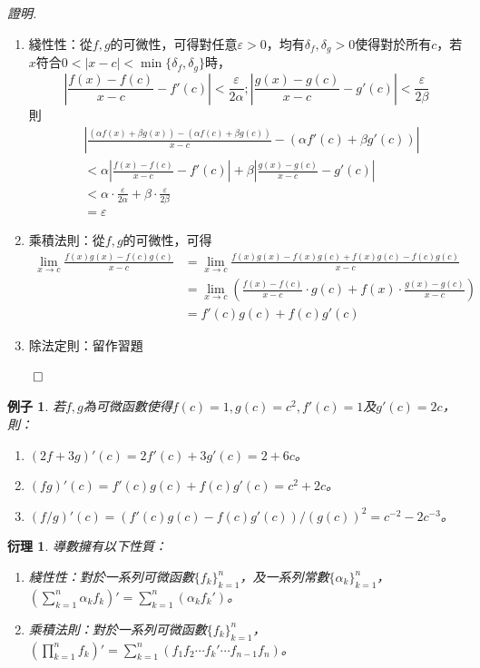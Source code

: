 \documentclass[12pt]{article}
\newtheorem*{corollary}{衍理}
\newtheorem*{example}{例子}
\renewenvironment*{proof}{\textit{證明.}}{\hfill$\qed$}
\begin{document}
    \begin{proof}
        \begin{enumerate}
            \item 綫性性：從$f,g$的可微性，可得對任意$\varepsilon>0$，均有$\delta_f,\delta_g>0$使得對於所有$c$，若$x$符合$0<|x-c|<\min\{\delta_f,\delta_g\}$時，$$|\frac{f(x)-f(c)}{x-c}-f'(c)|<\frac{\varepsilon}{2\alpha};|\frac{g(x)-g(c)}{x-c}-g'(c)|<\frac{\varepsilon}{2\beta}$$
            則\begin{align*}
                &|\frac{(\alpha f(x)+\beta g(x))-(\alpha f(c)+\beta g(c))}{x-c}-(\alpha f'(c)+\beta g'(c))|\\
                &<\alpha|\frac{f(x)-f(c)}{x-c}-f'(c)|+\beta|\frac{g(x)-g(c)}{x-c}-g'(c)|\\
                &<\alpha\cdot\frac{\varepsilon}{2\alpha}+\beta\cdot\frac{\varepsilon}{2\beta}\\
                &=\varepsilon
            \end{align*}
            \item 乘積法則：從$f,g$的可微性，可得
            \begin{align*}
                \lim_{x\to c}\frac{f(x)g(x)-f(c)g(c)}{x-c} &= \lim_{x\to c}\frac{f(x)g(x)-f(x)g(c)+f(x)g(c)-f(c)g(c)}{x-c}\\
                &=\lim_{x\to c}(\frac{f(x)-f(c)}{x-c}\cdot g(c)+f(x)\cdot \frac{g(x)-g(c)}{x-c})\\
                &=f'(c)g(c)+f(c)g'(c)
            \end{align*}
            \item 除法定則：留作習題
        \end{enumerate}
    \end{proof}

    \begin{example}
        若$f,g$為可微函數使得$f(c)=1, g(c)=c^2, f'(c)=1$及$g'(c)=2c$，則：\begin{enumerate}
            \item $(2f+3g)'(c)=2f'(c)+3g'(c)=2+6c$。
            \item $(fg)'(c)=f'(c)g(c)+f(c)g'(c)=c^2+2c$。
            \item $(f/g)'(c)=(f'(c)g(c)-f(c)g'(c))/(g(c))^2=c^{-2}-2c^{-3}$。
        \end{enumerate}
    \end{example}

    \begin{corollary}
        導數擁有以下性質：\begin{enumerate}
            \item 綫性性：對於一系列可微函數$\{f_k\}_{k=1}^n$，及一系列常數$\{\alpha_k\}_{k=1}^n$，$\displaystyle(\sum_{k=1}^{n}\alpha_k f_k)'=\sum_{k=1}^{n}(\alpha_k f_k')$。
            \item 乘積法則：對於一系列可微函數$\{f_k\}_{k=1}^n$，$\displaystyle(\prod_{k=1}^{n}f_k)'=\sum_{k=1}^{n}(f_1f_2\cdots f_k'\cdots f_{n-1}f_n)$。
        \end{enumerate}
    \end{corollary}
\end{document}
